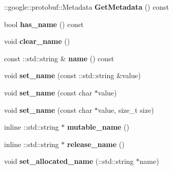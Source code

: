 \begin{DoxyCompactItemize}
\+::google\+::protobuf\+::\+Metadata {\bfseries Get\+Metadata} () const
\item 
\mbox{\label{classcaffe_1_1_layer_parameter_acc096ec98534e1078e7c6a10ef1ee3ed}} 
bool {\bfseries has\+\_\+name} () const
\item 
\mbox{\label{classcaffe_1_1_layer_parameter_adac91719a7b8564db3251484e7b2555b}} 
void {\bfseries clear\+\_\+name} ()
\item 
\mbox{\label{classcaffe_1_1_layer_parameter_a6b79b4360029a0a61471229ef532d7fd}} 
const \+::std\+::string \& {\bfseries name} () const
\item 
\mbox{\label{classcaffe_1_1_layer_parameter_a0e0772ecd8e1b154709528d14f12c0f8}} 
void {\bfseries set\+\_\+name} (const \+::std\+::string \&value)
\item 
\mbox{\label{classcaffe_1_1_layer_parameter_acfa7de613e05be903c94e7807ed52d12}} 
void {\bfseries set\+\_\+name} (const char $\ast$value)
\item 
\mbox{\label{classcaffe_1_1_layer_parameter_aae3762f2a629542b74c8d4520712b67b}} 
void {\bfseries set\+\_\+name} (const char $\ast$value, size\+\_\+t size)
\item 
\mbox{\label{classcaffe_1_1_layer_parameter_a5b156adc1407d80fc5a14bab7f08e66c}} 
inline \+::std\+::string $\ast$ {\bfseries mutable\+\_\+name} ()
\item 
\mbox{\label{classcaffe_1_1_layer_parameter_a2c45393ebb27474ad58357f8ec24ecc7}} 
inline \+::std\+::string $\ast$ {\bfseries release\+\_\+name} ()
\item 
\mbox{\label{classcaffe_1_1_layer_parameter_a5a708b45c82367c84803b7d04077faa9}} 
void {\bfseries set\+\_\+allocated\+\_\+name} (\+::std\+::string $\ast$name)
\item 
\mbox{\label{classcaffe_1_1_layer_parameter_adcd16cc6060150549f379123c8db76d2}} 

\end{DoxyCompactItemize}
